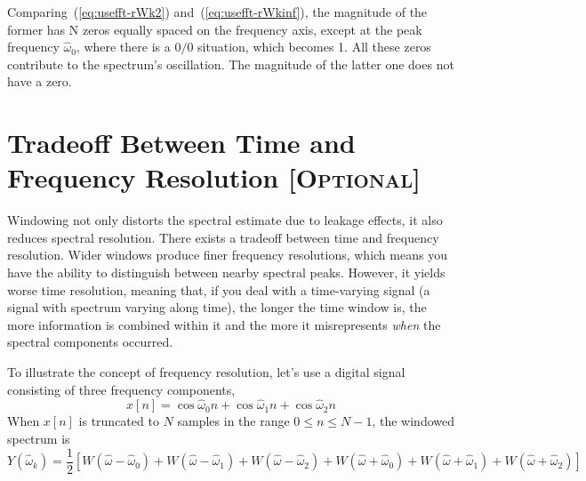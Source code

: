 Comparing~(\ref{eq:usefft-rWk2}) and~(\ref{eq:usefft-rWkinf}), the
magnitude of the former has N zeros equally spaced on the frequency
axis, except at the peak frequency $\hat{\omega}_0$, where there is a
$0/0$ situation, which becomes 1. All these zeros contribute to the
spectrum's oscillation. The magnitude of the latter one does not have
a zero.



\section{Tradeoff Between Time and Frequency Resolution
  [\textsc{Optional}]}

Windowing not only distorts the spectral estimate due to leakage
effects, it also reduces spectral resolution.  There exists a tradeoff
between time and frequency resolution. Wider windows produce finer
frequency resolutions, which means you have the ability to distinguish
between nearby spectral peaks. However, it yields worse time
resolution, meaning that, if you deal with a time-varying signal (a
signal with spectrum varying along time), the longer the time window is,
the more information is combined within it and the more it
misrepresents \emph{when} the spectral components occurred.

To illustrate the concept of frequency resolution, let's use a digital
signal consisting of three frequency components,
\begin{equation}
x[n] = \cos\hat{\omega}_0 n+\cos\hat{\omega}_1 n + \cos\hat{\omega}_2 n
\label{eq:usefft-cos3a}
\end{equation}
When $x[n]$ is truncated to $N$ samples in the range $0 \le n \le N-1$,
the windowed spectrum is
\begin{equation}
Y(\hat{\omega}_k) =
\frac{1}{2}[W(\hat{\omega}-\hat{\omega}_0)+W(\hat{\omega}-\hat{\omega}_1)
            + W(\hat{\omega}-\hat{\omega}_2)+W(\hat{\omega}+\hat{\omega}_0)
            + W(\hat{\omega}+\hat{\omega}_1)+W(\hat{\omega}+\hat{\omega}_2)]
\label{eq:usefft-cos3}
\end{equation}

